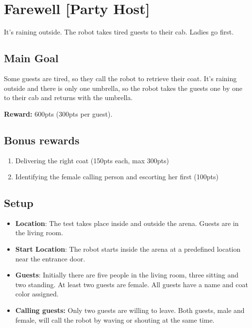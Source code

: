\section{Farewell [Party Host]}
It's raining outside. The robot takes tired guests to their cab. Ladies go first.


\subsection{Main Goal}
Some guests are tired, so they call the robot to retrieve their coat.
It's raining outside and there is only one umbrella, so the robot takes the guests one by one to their cab and returns with the umbrella.

\noindent\textbf{Reward:} 600pts (300pts per guest).

\subsection{Bonus rewards}
\begin{enumerate}[nosep]
	\item Delivering the right coat (150pts each, max 300pts)
	\item Identifying the female calling person and escorting her first (100pts)
\end{enumerate}


\subsection{Setup}
\begin{itemize}
	\item \textbf{Location}: The test takes place inside and outside the arena.
	Guests are in the living room.

	\item \textbf{Start Location}: The robot starts inside the arena at a predefined location near the entrance door.

	\item \textbf{Guests}: Initially there are five people in the living room, three sitting and two standing.
	At least two guests are female.
	All guests have a name and coat color assigned.

	\item \textbf{Calling guests:} Only two guests are willing to leave. Both guests, male and female, will call the robot by waving or shouting at the same time.
\end{itemize}

